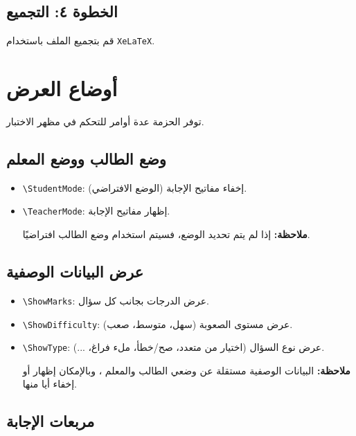 \documentclass[a4paper]{article}
\newcommand{\engtt}[1]{\textenglish{\texttt{#1}}}
\begin{document}
\subsection*{الخطوة ٤: التجميع}

قم بتجميع الملف باستخدام \engtt{XeLaTeX}.

\section{أوضاع العرض}

توفر الحزمة عدة أوامر للتحكم في مظهر الاختبار.

\subsection*{وضع الطالب ووضع المعلم}

\begin{itemize}
    \item \engtt{\textbackslash StudentMode}: إخفاء مفاتيح الإجابة (الوضع الافتراضي).
    \item \engtt{\textbackslash TeacherMode}: إظهار مفاتيح الإجابة.\par
          \textbf{ملاحظة:} إذا لم يتم تحديد الوضع، فسيتم استخدام وضع الطالب افتراضيًا.
\end{itemize}

\subsection*{عرض البيانات الوصفية}

\begin{itemize}
    \item \engtt{\textbackslash ShowMarks}: عرض الدرجات بجانب كل سؤال.
    \item \engtt{\textbackslash ShowDifficulty}: عرض مستوى الصعوبة (سهل، متوسط، صعب).
    \item \engtt{\textbackslash ShowType}: عرض نوع السؤال (اختيار من متعدد، صح/خطأ، ملء فراغ، ...).\par
          \textbf{ملاحظة:} البيانات الوصفية مستقلة عن وضعي الطالب والمعلم ، وبالإمكان إظهار أو إخفاء أيا منها.
\end{itemize}

\subsection*{مربعات الإجابة}
\end{document}
